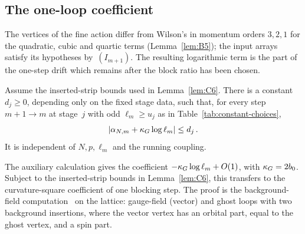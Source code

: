 \subsection{The one-loop coefficient}\label{subsec:C-coefficient}

The vertices of the fine action differ from Wilson's in momentum orders $3,2,1$ for the quadratic, cubic and quartic terms (Lemma~\ref{lem:B5}); the input arrays satisfy its hypotheses by~$(I_{m+1})$. The resulting logarithmic term is the part of the one-step drift which remains after the block ratio has been chosen.

\begin{lemma}\label{lem:C7}
Assume the inserted-strip bounds used in Lemma~\ref{lem:C6}. There is a constant $d_j\ge0$, depending only on the fixed stage data, such that, for every step $m+1\to m$ at stage~$j$ with odd $\ell_m\ge u_j$ as in Table~\ref{tab:constant-choices},
\begin{equation*}
|\alpha_{N,m}+\kappa_G\log\ell_m|\le d_j\,.
\end{equation*}
It is independent of $N,p,\ell_m$ and the running coupling.
\end{lemma}
The auxiliary calculation gives the coefficient $-\kappa_G\log\ell_m+O(1)$, with $\kappa_G=2b_0$. Subject to the inserted-strip bounds in Lemma~\ref{lem:C6}, this transfers to the curvature-square coefficient of one blocking step. The proof is the background-field computation~\cite{Abbott1982} on the lattice: gauge-field (vector) and ghost loops with two background insertions, where the vector vertex has an orbital part, equal to the ghost vertex, and a spin part.

